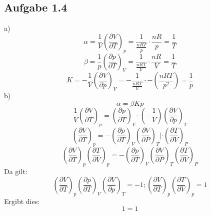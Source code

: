 \documentclass{article}
\begin{document}
\subsection*{Aufgabe 1.4}
a)
\begin{equation*}
    \alpha = \frac{1}{V}\left(\frac{\partial V}{\partial T}\right)_p = \frac{1}{\frac{nRT}{p}} \cdot \frac{nR}{p} = \frac{1}{T}
\end{equation*}
\begin{equation*}
    \beta = \frac{1}{p}\left(\frac{\partial p}{\partial T}\right)_V = \frac{1}{\frac{nRT}{V}} \cdot \frac{nR}{V} = \frac{1}{T}
\end{equation*}
\begin{equation*}
    K = -\frac{1}{V}\left(\frac{\partial V}{\partial p}\right)_V = -\frac{1}{\frac{nRT}{V}} \cdot -\left(\frac{nRT}{p^2}\right) = \frac{1}{p}
\end{equation*}
b)
\begin{equation*}
    \alpha = \beta K p
\end{equation*}
\begin{equation*}
    \frac{1}{V}\left(\frac{\partial V}{\partial T}\right)_p = \left(\frac{\partial p}{\partial T}\right)_V\cdot \left(-\frac{1}{V}\right)\left(\frac{\partial V}{\partial p}\right)_T
\end{equation*}
\begin{equation*}
    \left(\frac{\partial V}{\partial T}\right)_p = -\left(\frac{\partial p}{\partial T}\right)_V \left(\frac{\partial V}{\partial P}\right)_T   |\cdot \left(\frac{\partial T}{\partial V}\right)_P
\end{equation*}
\begin{equation*}
    \left(\frac{\partial V}{\partial T}\right)_p \left(\frac{\partial T}{\partial V}\right)_p = -\left(\frac{\partial p}{\partial T}\right)_V \left(\frac{\partial V}{\partial P}\right)_T \left(\frac{\partial T}{\partial V}\right)_P
\end{equation*}
Da gilt:
\begin{equation*}
    \left(\frac{\partial V}{\partial T}\right)_p\left(\frac{\partial p}{\partial T}\right)_V\left(\frac{\partial V}{\partial p}\right)_T = -1 ; \left(\frac{\partial V}{\partial T}\right)_p \left(\frac{\partial T}{\partial V}\right)_p = 1
\end{equation*}
Ergibt dies:
\begin{equation*}
    1 = 1
\end{equation*}
\end{document}
